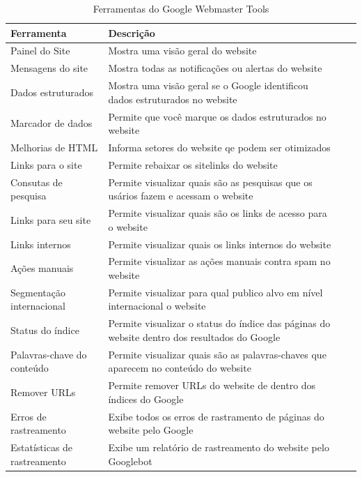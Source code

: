 \documentclass[
	12pt,				%
	openright,			%
	twoside,			%
	a4paper,			%
	english,			%
	french,				%
	spanish,			%
	brazil				%
	]{abntex2}
\begin{document}
\begin{table}[htb]
\ABNTEXfontereduzida
\caption[Ferramentas do Google Webmaster Tools]{Ferramentas do Google Webmaster Tools}
\label{tab-nivinv}
\begin{center}
\begin{tabular}{p{2.6cm}|p{6.0cm}|p{2.25cm}|p{3.40cm}}
   \textbf{Ferramenta} & \textbf{Descrição} \\
    \hline
    Painel do Site & Mostra uma visão geral do website \\
    \hline
    Mensagens do site & Mostra todas as notificações ou alertas do website \\
    \hline
    Dados estruturados & Mostra uma visão geral se o Google identificou dados estruturados no website \\
    \hline
    Marcador de dados & Permite que você marque os dados estruturados no website \\
    \hline
    Melhorias de HTML & Informa setores do website qe podem ser otimizados \\
    \hline
    Links para o site & Permite rebaixar os sitelinks do website \\
    \hline
    Consutas de pesquisa & Permite visualizar quais são as pesquisas que os usários fazem e acessam o website \\
    \hline
    Links para seu site & Permite visualizar quais são os links de acesso para o website \\
    \hline
    Links internos & Permite visualizar quais os links internos do website \\
    \hline
    Ações manuais & Permite visualizar as ações manuais contra spam no website \\
    \hline
    Segmentação internacional & Permite visualizar para qual publico alvo em nível internacional o website \\
    \hline
    Status do índice & Permite visualizar o status do índice das páginas do website dentro dos resultados do Google \\
    \hline
    Palavras-chave do conteúdo & Permite visualizar quais são as palavras-chaves que aparecem no conteúdo do website \\
    \hline
    Remover URLs & Permite remover URLs do website de dentro dos índices do Google \\
    \hline
    Erros de rastreamento & Exibe todos os erros de rastramento de páginas do website pelo Google \\
    \hline
    Estatísticas de rastreamento & Exibe um relatório de rastreamento do website pelo Googlebot \\

\end{tabular}
\end{center}
\end{table}
\end{document}
